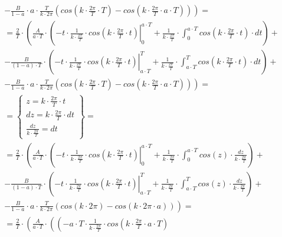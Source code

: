 \begin{task}
\begin{align*}
&-\left. \frac{B}{1-a}\cdot a \cdot \frac{T}{k \cdot 2\pi} \left( cos\left(k \cdot \frac{2\pi}{T} \cdot T\right) - cos\left(k \cdot \frac{2\pi}{T} \cdot a \cdot T\right) \right)\right)=\\
&=\frac{2}{T}\cdot\left( \frac{A}{a \cdot T} \cdot \left( \left. - t \cdot \frac{1}{k \cdot \frac{2\pi}{T}} \cdot cos\left( k \cdot \frac{2\pi}{T} \cdot t\right)
\right|_{0}^{a\cdot T} + \frac{1}{k \cdot \frac{2\pi}{T}} \cdot \int_{0}^{a\cdot T} cos\left( k \cdot \frac{2\pi}{T} \cdot t\right) \cdot dt\right) \right. + \\
&-\left.\frac{B}{\left(1-a\right)\cdot T}\cdot \left( \left.- t \cdot \frac{1}{k \cdot \frac{2\pi}{T}} \cdot cos\left( k \cdot \frac{2\pi}{T} \cdot t\right) \right|_{a \cdot T}^{T} + \frac{1}{k \cdot \frac{2\pi}{T}} \cdot \int_{a \cdot T}^{T} cos\left( k \cdot \frac{2\pi}{T} \cdot t\right) \cdot dt \right)\right. +\\
&-\left. \frac{B}{1-a}\cdot a \cdot \frac{T}{k \cdot 2\pi} \left( cos\left(k \cdot \frac{2\pi}{T} \cdot T\right) - cos\left(k \cdot \frac{2\pi}{T} \cdot a \cdot T\right) \right)\right)=\\
&=\left\{\begin{array}{l}
z = k \cdot \frac{2\pi}{T} \cdot t \\
dz = k \cdot \frac{2\pi}{T} \cdot dt \\
\frac{dz}{k \cdot \frac{2\pi}{T}} = dt
\end{array}\right\}=\\
&=\frac{2}{T}\cdot\left( \frac{A}{a \cdot T} \cdot \left( \left. -t \cdot \frac{1}{k \cdot \frac{2\pi}{T}} \cdot cos\left( k \cdot \frac{2\pi}{T} \cdot t\right)
\right|_{0}^{a\cdot T} + \frac{1}{k \cdot \frac{2\pi}{T}} \cdot \int_{0}^{a\cdot T} cos\left(z\right) \cdot \frac{dz}{k \cdot \frac{2\pi}{T}}\right) \right. + \\
&-\left.\frac{B}{\left(1-a\right)\cdot T}\cdot \left( \left. -t \cdot \frac{1}{k \cdot \frac{2\pi}{T}} \cdot cos\left( k \cdot \frac{2\pi}{T} \cdot t\right) \right|_{a \cdot T}^{T} + \frac{1}{k \cdot \frac{2\pi}{T}} \cdot \int_{a \cdot T}^{T}  cos\left( z\right) \cdot \frac{dz}{k \cdot \frac{2\pi}{T}} \right)\right. +\\
&-\left. \frac{B}{1-a}\cdot a \cdot \frac{T}{k \cdot 2\pi} \left( cos\left(k \cdot 2\pi\right) - cos\left(k \cdot 2\pi \cdot a\right) \right)\right)=\\
&=\frac{2}{T}\cdot\left( \frac{A}{a \cdot T} \cdot \left( \left( - a\cdot T \cdot \frac{1}{k \cdot \frac{2\pi}{T}} \cdot cos\left( k \cdot \frac{2\pi}{T} \cdot a\cdot T\right)

\end{align*}
\end{task}
